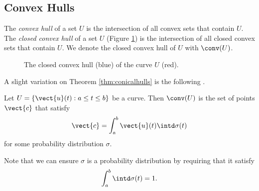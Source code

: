 \subsection{Convex Hulls}
The \emph{convex hull} of a set $U$ is the intersection of all convex sets that contain $U$. The \emph{closed convex hull} of a set $U$ (Figure \ref{fig:closedconvexhullofU}) is the intersection of all closed convex sets that contain $U$. We denote the closed convex hull of $U$ with $\conv(U)$.
\begin{figure}[ht]
	\centering
	\caption{The closed convex hull (blue) of the curve $U$ (red).}\label{fig:closedconvexhullofU}
\end{figure}

A slight variation on Theorem \ref{thm:conicalhulls} is the following \cite{Krein1977-ak}.

\begin{theorem}
	Let $U = \left \lbrace \vect{u}(t) : a \leq t \leq b \right\rbrace$ be a curve. Then $\conv(U)$ is the set of points $\vect{c}$ that satisfy
	\begin{equation}
	\vect{c} = \int_a^b \vect{u}(t) \intd \sigma(t)
	\end{equation}
	for some probability distribution $\sigma$.
	\label{thm:convexhulls}
\end{theorem}

Note that we can ensure $\sigma$ is a probability distribution by requiring that it satisfy
\begin{equation}
	\int_a^b \intd \sigma(t) = 1.
\end{equation}

